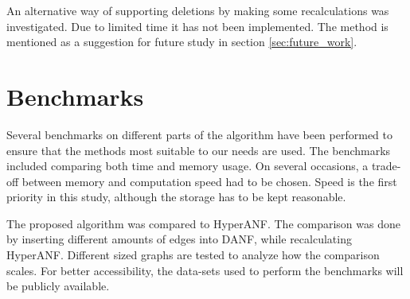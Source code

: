 An alternative way of supporting deletions by making some recalculations was investigated. Due to limited time it has not been implemented. The method is mentioned as a suggestion for future study in section \ref{sec:future_work}.

\section{Benchmarks} 
Several benchmarks on different parts of the algorithm have been performed to ensure that the methods most suitable to our needs are used. The benchmarks included comparing both time and memory usage. On several occasions, a trade-off between memory and computation speed had to be chosen. Speed is the first priority in this study, although the storage has to be kept reasonable. 

The proposed algorithm was compared to HyperANF. The comparison was done by inserting different amounts of edges into DANF, while recalculating HyperANF. Different sized graphs are tested to analyze how the comparison scales. For better accessibility, the data-sets used to perform the benchmarks will be publicly available.

